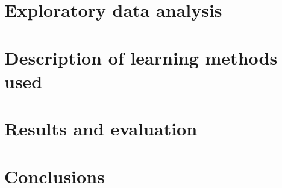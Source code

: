 \documentclass[11pt, a4paper]{article}
\begin{document}
\section{Exploratory data analysis}

\section{Description of learning methods used}

\section{Results and evaluation}

\section{Conclusions}
\end{document}
